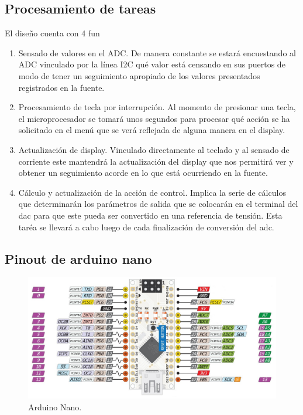 \subsection{Procesamiento de tareas}
El diseño cuenta con 4 fun
\begin{enumerate}
    \item Sensado de valores en el ADC.
    De manera constante se estará encuestando al ADC vinculado por la línea I2C qué valor está censando en sus puertos de modo de tener un seguimiento apropiado de los valores presentados registrados en la fuente.    
    \item Procesamiento de tecla por interrupción.
    Al momento de presionar una tecla, el microprocesador se tomará unos segundos para procesar qué acción se ha solicitado en el menú que se verá reflejada de alguna manera en el display.
    \item Actualización de display.
    Vinculado directamente al teclado y al sensado de corriente este mantendrá la actualización del display que nos permitirá ver y obtener un seguimiento acorde en lo que está ocurriendo en la fuente.
    \item Cálculo y actualización de la acción de control.
    Implica la serie de cálculos que determinarán los parámetros de salida que se colocarán en el terminal del dac para que este pueda ser convertido en una referencia de tensión. Esta taréa se llevará a cabo luego de cada finalización de conversión del adc.
\end{enumerate}

\subsection{Pinout de arduino nano}

\begin{figure}[H]
    \centering
    \includegraphics[scale=0.3]{./imagenes/arduino_nano.jpg}
    \caption{Arduino Nano.}
    \label{F:arduino_nano}
\end{figure}

